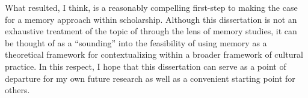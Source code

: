

What resulted, I think, is a reasonably compelling first-step to making the case for a memory approach within \rwb scholarship. Although this dissertation is not an exhaustive treatment of the topic of \rwb through the lens of memory studies, it can be thought of as a ``sounding'' into the feasibility of using memory as a theoretical framework for contextualizing \rwb within a broader framework of cultural practice. In this respect, I hope that this dissertation can serve as a point of departure for my own future research as well as a convenient starting point for others. 